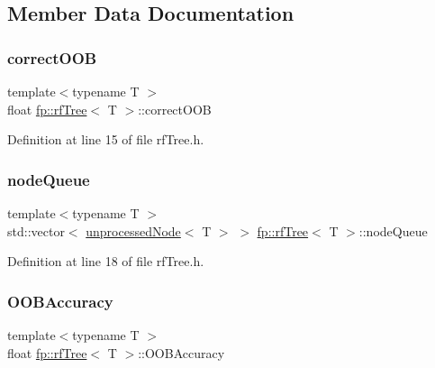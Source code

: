 \subsection{Member Data Documentation}
\mbox{\label{classfp_1_1rfTree_a83832650bcea8d63cdcd480d9ddc6e6e}} 
\subsubsection{\texorpdfstring{correct\+O\+OB}{correctOOB}}
{\footnotesize\ttfamily template$<$typename T $>$ \\
float \hyperlink{classfp_1_1rfTree}{fp\+::rf\+Tree}$<$ T $>$\+::correct\+O\+OB\hspace{0.3cm}{\ttfamily [protected]}}



Definition at line 15 of file rf\+Tree.\+h.

\mbox{\label{classfp_1_1rfTree_af72d0a2f930fd480dfb4858885c2df23}} 
\subsubsection{\texorpdfstring{node\+Queue}{nodeQueue}}
{\footnotesize\ttfamily template$<$typename T $>$ \\
std\+::vector$<$ \hyperlink{classfp_1_1unprocessedNode}{unprocessed\+Node}$<$ T $>$ $>$ \hyperlink{classfp_1_1rfTree}{fp\+::rf\+Tree}$<$ T $>$\+::node\+Queue\hspace{0.3cm}{\ttfamily [protected]}}



Definition at line 18 of file rf\+Tree.\+h.

\mbox{\label{classfp_1_1rfTree_a673f85d4df6f292a1819351c092a07e1}} 
\subsubsection{\texorpdfstring{O\+O\+B\+Accuracy}{OOBAccuracy}}
{\footnotesize\ttfamily template$<$typename T $>$ \\
float \hyperlink{classfp_1_1rfTree}{fp\+::rf\+Tree}$<$ T $>$\+::O\+O\+B\+Accuracy\hspace{0.3cm}{\ttfamily [protected]}}



